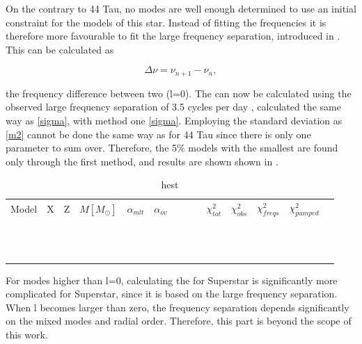 On the contrary to 44 Tau, no modes are well enough determined to use an initial constraint for the models of this star. Instead of fitting the frequencies it is therefore more favourable to fit the large frequency separation, introduced in . This can be calculated as

\begin{equation}
    \Delta\nu = \nu_{n+1} - \nu_{n},
\end{equation}

\noindent the frequency difference between two (l=0).  The \chis can now be calculated using the observed large frequency separation of 3.5 cycles per day \citep{antoci2014role}, calculated the same way as  \eqref{sigma}, with method one \eqref{sigma}. Employing the standard deviation as \eqref{m2} cannot be done the same way as for 44 Tau since there is only one parameter to sum over. Therefore, the 5\% models with the smallest \chis are found only through the first method, and results are shown shown in .

\begin{table}
  \caption{hest}
  \label{tab:superstar}

	\begin{tabular}{llllllllllllll}
	 Model & X & Z & $M[M_\odot]$ & $\alpha_{mlt}$ & $\alpha_{ov}$ & \teff  & \logg  & \lum & $\chi_{tot}^2$ &$\chi_{obs}^2$ & $\chi_{freqs}^2$ & $\chi_{pumped}^2$\\
	 &  &  &  &  &  &  &  &  &  &  \\
 	&  &  &  &  &  &  &  &  &  &  \\
 	&  &  &  &  &  &  &  &  &  &  \\
	 &  &  &  &  &  &  &  &  &  &  \\
 	&  &  &  &  &  &  &  &  &  &  \\
	 &  &  &  &  &  &  &  &  &  &  \\
	 &  &  &  &  &  &  &  &  &  &  \\
	 &  &  &  &  &  &  &  &  &  &  \\
	 &  &  &  &  &  &  &  &  &  &  \\
	 &  &  &  &  &  &  &  &  &  &  \\
 	&  &  &  &  &  &  &  &  &  &  \\
 	&  &  &  &  &  &  &  &  &  &  \\
	\end{tabular}
\end{table}

For modes higher than l=0, calculating the \chis for Superstar is significantly more complicated for Superstar, since it is based on the large frequency separation. When l becomes larger than zero, the frequency separation depends significantly on the mixed modes and radial order. Therefore, this part is beyond the scope of this work. 

